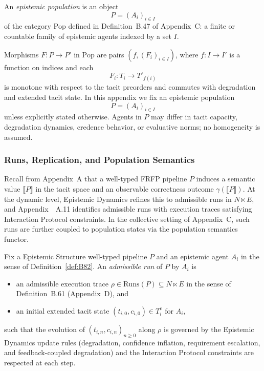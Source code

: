 \begin{definition}\label{def:B83}
An \emph{epistemic population} is an object
\[
  P = (A_i)_{i \in I}
\]
of the category $\mathrm{Pop}$ defined in Definition~B.47 of Appendix~C: a finite or countable family of epistemic agents indexed by a set $I$.

Morphisms $F : P \to P'$ in $\mathrm{Pop}$ are pairs $(f, (F_i)_{i \in I})$, where $f : I \to I'$ is a function on indices and each
\[
  F_i : T_i \to T'_{f(i)}
\]
is monotone with respect to the tacit preorders and commutes with degradation and extended tacit state. In this appendix we fix an epistemic population
\[
  P = (A_i)_{i \in I}
\]
unless explicitly stated otherwise. Agents in $P$ may differ in tacit capacity, degradation dynamics, credence behavior, or evaluative norms; no homogeneity is assumed.
\end{definition}


\subsubsection{Runs, Replication, and Population Semantics}
\label{sec:appendix-E2}

Recall from Appendix~A that a well-typed FRFP pipeline $P$ induces a semantic value $\llbracket P \rrbracket$ in the tacit space and an observable correctness outcome $\gamma(\llbracket P \rrbracket)$. At the dynamic level, Epistemic Dynamics refines this to admissible runs in $N \ltimes E$, and Appendix~~A.11 identifies admissible runs with execution traces satisfying Interaction Protocol constraints. In the collective setting of Appendix~C, such runs are further coupled to population states via the population semantics functor.

\begin{definition}\label{def:B84}
Fix a Epistemic Structure well-typed pipeline $P$ and an epistemic agent $A_i$ in the sense of Definition~\ref{def:B82}. An \emph{admissible run} of $P$ by $A_i$ is
\begin{itemize}
  \item an admissible execution trace $\rho \in \mathrm{Runs}(P) \subseteq N \ltimes E$ in the sense of Definition~B.61 (Appendix~D), and
  \item an initial extended tacit state $(t_{i,0}, c_{i,0}) \in T^e_i$ for $A_i$,
\end{itemize}
such that the evolution of $(t_{i,n}, c_{i,n})_{n \ge 0}$ along $\rho$ is governed by the Epistemic Dynamics update rules (degradation, confidence inflation, requirement escalation, and feedback-coupled degradation) and the Interaction Protocol constraints are respected at each step.
\end{definition}

